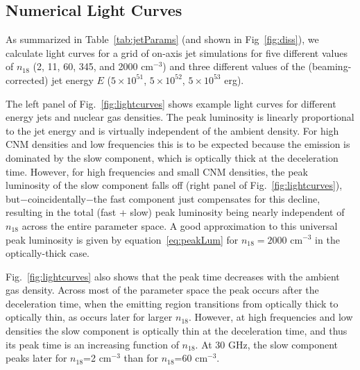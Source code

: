 \documentclass[usenatbib,fleqn]{mnras}
\begin{document}
\subsection{Numerical Light Curves}
\label{sec:numResults}
As summarized in Table~\ref{tab:jetParams} (and shown in
Fig~\ref{fig:diss}), we calculate light curves for a grid of on-axis
jet simulations for five different values of $n_{18}$ (2, 11, 60, 345,
and 2000 cm$^{-3}$) and three different values of the
(beaming-corrected) jet energy $E$ ($5\times 10^{51}$, $5\times
10^{52}$, $5\times 10^{53}$ erg).

The left panel of Fig.~\ref{fig:lightcurves} shows example light
curves for different energy jets and nuclear gas densities. The peak
luminosity is linearly proportional to the jet energy and is virtually independent of the ambient density.  For high CNM densities and low frequencies this is to be expected because the emission is dominated by the slow component, which is optically thick at the deceleration time.  However, for high frequencies and small CNM densities, the peak luminosity of the slow component falls off (right panel of
Fig.~\ref{fig:lightcurves}), but$-$coincidentally$-$the fast component just compensates for this decline, resulting in the total (fast + slow) peak luminosity being nearly independent of $n_{18}$ across the entire parameter space.  A good approximation to this universal peak luminosity is given by equation~\ref{eq:peakLum} for $n_{18}=2000$ cm$^{-3}$ in the optically-thick case.

Fig.~\ref{fig:lightcurves} also shows that the peak time decreases with the ambient gas density.  Across most of the parameter space the peak occurs after the deceleration time, when the emitting region transitions from
optically thick to optically thin, as occurs later for larger $n_{18}$. However, at high frequencies and low densities the slow component is optically thin at the deceleration time, and thus its peak time is an increasing function of $n_{18}$. At 30 GHz, the slow component peaks later for $n_{18}$=2 cm$^{-3}$ than for $n_{18}$=60 cm$^{-3}$.
\end{document}
